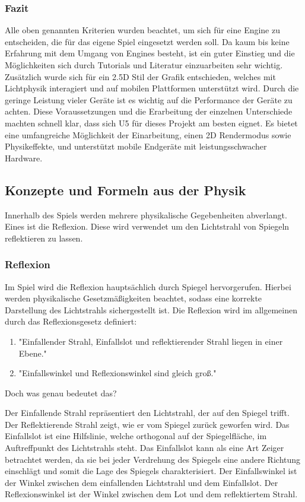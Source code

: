 \subsubsection{Fazit}
Alle oben genannten Kriterien wurden beachtet, um sich für eine Engine zu entscheiden, die für das eigene Spiel eingesetzt werden soll. Da kaum bis keine Erfahrung mit dem Umgang von Engines besteht, ist ein guter Einstieg und die Möglichkeiten sich durch Tutorials und Literatur einzuarbeiten sehr wichtig. Zusätzlich wurde sich für ein 2.5D Stil der Grafik entschieden, welches mit Lichtphysik interagiert und auf mobilen Plattformen unterstützt wird. Durch die geringe Leistung vieler Geräte ist es wichtig auf die Performance der Geräte zu achten. Diese Voraussetzungen und die Erarbeitung der einzelnen Unterschiede machten schnell klar, dass sich \ac{U5} für dieses Projekt am besten eignet. Es bietet eine umfangreiche Möglichkeit der Einarbeitung, einen 2D Rendermodus sowie Physikeffekte, und unterstützt mobile Endgeräte mit leistungsschwacher Hardware. 

\subsection{Konzepte und Formeln aus der Physik}
Innerhalb des Spiels werden mehrere physikalische Gegebenheiten abverlangt. Eines ist die Reflexion. Diese wird verwendet um den Lichtstrahl von Spiegeln reflektieren zu lassen.
\subsubsection{Reflexion}
Im Spiel wird die Reflexion hauptsächlich durch Spiegel hervorgerufen. Hierbei werden physikalische Gesetzmäßigkeiten beachtet, sodass eine korrekte Darstellung des Lichtstrahls sichergestellt ist. Die Reflexion wird im allgemeinen durch das Reflexionsgesetz definiert:
\begin{enumerate}
\item "{}Einfallender Strahl, Einfallslot und reflektierender Strahl liegen in einer Ebene."{}
\item "{}Einfallswinkel und Reflexionswinkel sind gleich groß."{}\cite{baderdorn1980}
\end{enumerate}
Doch was genau bedeutet das?

Der Einfallende Strahl repräsentiert den Lichtstrahl, der auf den Spiegel trifft. Der Reflektierende Strahl zeigt, wie er vom Spiegel zurück geworfen wird. Das Einfallslot ist eine Hilfslinie, welche orthogonal auf der Spiegelfläche, im Auftreffpunkt des Lichtstrahls steht. Das Einfallslot kann als eine Art Zeiger betrachtet werden, da sie bei jeder Verdrehung des Spiegels eine andere Richtung einschlägt und somit die Lage des Spiegels charakterisiert. Der Einfallswinkel ist der Winkel zwischen dem einfallenden Lichtstrahl und dem Einfallslot. Der Reflexionswinkel ist der Winkel zwischen dem Lot und dem reflektiertem Strahl.


